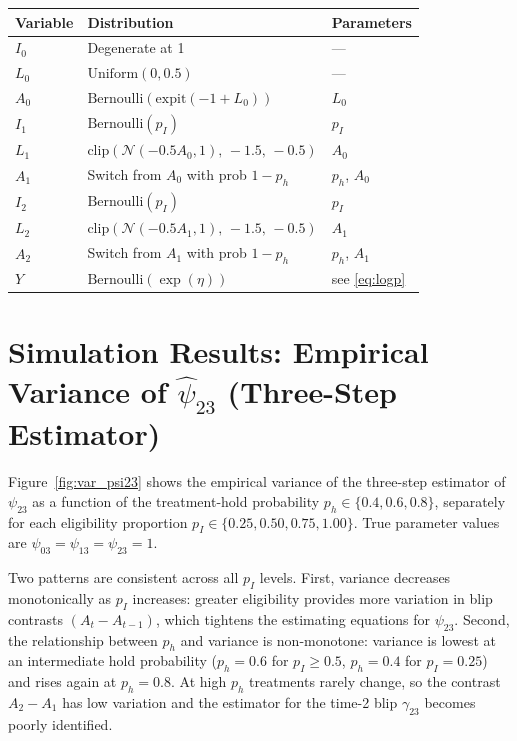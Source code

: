 \documentclass[12pt]{article}
\begin{document}
\begin{center}
\begin{tabular}{lll}
\toprule
Variable & Distribution & Parameters \\
\midrule
$I_0$    & Degenerate at 1 & --- \\
$L_0$    & $\mathrm{Uniform}(0, 0.5)$ & --- \\
$A_0$    & $\mathrm{Bernoulli}(\mathrm{expit}(-1+L_0))$ & $L_0$ \\
$I_1$    & $\mathrm{Bernoulli}(p_I)$ & $p_I$ \\
$L_1$    & $\mathrm{clip}(\mathcal{N}(-0.5A_0,1),\,-1.5,\,-0.5)$ & $A_0$ \\
$A_1$    & Switch from $A_0$ with prob $1-p_h$ & $p_h$, $A_0$ \\
$I_2$    & $\mathrm{Bernoulli}(p_I)$ & $p_I$ \\
$L_2$    & $\mathrm{clip}(\mathcal{N}(-0.5A_1,1),\,-1.5,\,-0.5)$ & $A_1$ \\
$A_2$    & Switch from $A_1$ with prob $1-p_h$ & $p_h$, $A_1$ \\
$Y$      & $\mathrm{Bernoulli}(\exp(\eta))$ & see \eqref{eq:logp} \\
\bottomrule
\end{tabular}
\end{center}

\section{Simulation Results: Empirical Variance of $\hat\psi_{23}$ (Three-Step Estimator)}

Figure~\ref{fig:var_psi23} shows the empirical variance of the three-step
estimator of $\psi_{23}$ as a function of the treatment-hold probability
$p_h \in \{0.4, 0.6, 0.8\}$, separately for each eligibility proportion
$p_I \in \{0.25, 0.50, 0.75, 1.00\}$.  True parameter values are
$\psi_{03} = \psi_{13} = \psi_{23} = 1$.

Two patterns are consistent across all $p_I$ levels.  First, variance
decreases monotonically as $p_I$ increases: greater eligibility provides
more variation in blip contrasts $(A_t - A_{t-1})$, which tightens the
estimating equations for $\psi_{23}$.  Second, the relationship between
$p_h$ and variance is non-monotone: variance is lowest at an intermediate
hold probability ($p_h = 0.6$ for $p_I \geq 0.5$, $p_h = 0.4$ for
$p_I = 0.25$) and rises again at $p_h = 0.8$.  At high $p_h$ treatments
rarely change, so the contrast $A_2 - A_1$ has low variation and the
estimator for the time-2 blip $\gamma_{23}$ becomes poorly identified.
\end{document}
